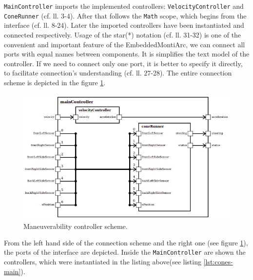 \bigskip
\texttt{MainController} imports the implemented controllers: \texttt{VelocityController} and \texttt{ConeRunner} (cf. ll. 3-4). After that follows the \texttt{Math} scope, which begins from the interface (cf. ll. 8-24). Later the imported controllers have been instantiated and connected respectively. Usage of the star(*) notation (cf. ll. 31-32) is one of the convenient and important feature of the EmbeddedMontiArc, we can connect all ports with equal names between components. It is simplifies the text model of the controller. If we need to connect only one port, it is better to specify it directly, to facilitate connection's understanding (cf. ll. 27-28). The entire connection scheme is depicted in the figure \ref{fig:maneuverability-scheme}.
\begin{figure}[ht]
    \centering
    \includegraphics[width=0.8\linewidth]{src/pic/controller04}
    \caption{Maneuverability controller scheme.}
    \label{fig:maneuverability-scheme}
\end{figure} \newline
From the left hand side of the connection scheme and the right one (see figure \ref{fig:maneuverability-scheme}), the ports of the interface are depicted. Inside the \texttt{MainController} are shown the controllers, which were instantiated in the listing above(see listing \ref{lst:cones-main}).

